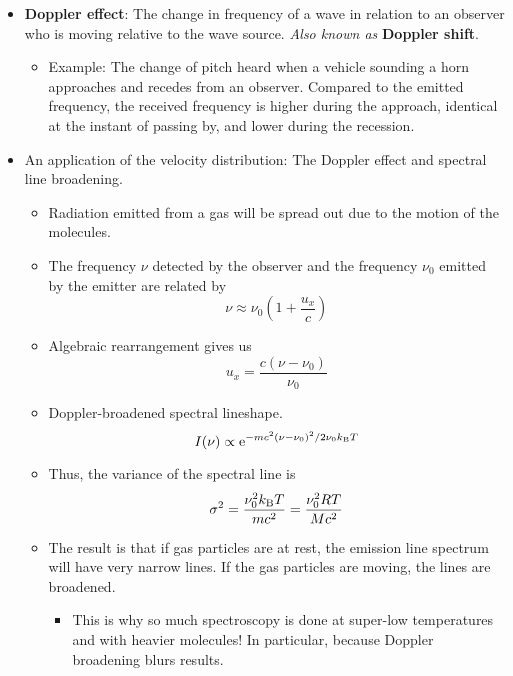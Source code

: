 \documentclass[../notes.tex]{subfiles}
\begin{document}
\begin{itemize}
    \item \textbf{Doppler effect}: The change in frequency of a wave in relation to an observer who is moving relative to the wave source. \emph{Also known as} \textbf{Doppler shift}.
    \begin{itemize}
        \item Example: The change of pitch heard when a vehicle sounding a horn approaches and recedes from an observer. Compared to the emitted frequency, the received frequency is higher during the approach, identical at the instant of passing by, and lower during the recession.
    \end{itemize}
    \item An application of the velocity distribution: The Doppler effect and spectral line broadening.
    \begin{itemize}
        \item Radiation emitted from a gas will be spread out due to the motion of the molecules.
        \item The frequency $\nu$ detected by the observer and the frequency $\nu_0$ emitted by the emitter are related by
        \begin{equation*}
            \nu \approx \nu_0\left( 1+\frac{u_x}{c} \right)
        \end{equation*}
        \item Algebraic rearrangement gives us
        \begin{equation*}
            u_x = \frac{c(\nu-\nu_0)}{\nu_0}
        \end{equation*}
        \item Doppler-broadened spectral lineshape.
        \begin{equation*}
            I(\nu) \propto \e[-mc^2(\nu-\nu_0)^2/2\nu_0\kB T]
        \end{equation*}
        \item Thus, the variance of the spectral line is
        \begin{equation*}
            \sigma^2 = \frac{\nu_0^2\kB T}{mc^2}
            = \frac{\nu_0^2RT}{Mc^2}
        \end{equation*}
        \item The result is that if gas particles are at rest, the emission line spectrum will have very narrow lines. If the gas particles are moving, the lines are broadened.
        \begin{itemize}
            \item This is why so much spectroscopy is done at super-low temperatures and with heavier molecules! In particular, because Doppler broadening blurs results.

\end{itemize}
\end{itemize}
\end{itemize}
\end{document}
